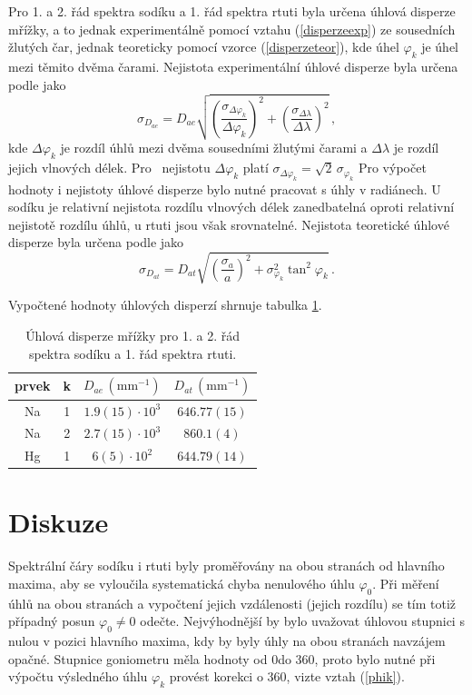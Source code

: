 \documentclass{../concepts/titul_protokol_p/prepareprotokol} %
\newcommand{\relative}[1]{
\frac{\sigma_{#1}}{#1}
}
\newcommand{\squared}[1]{
\left( #1 \right)^2
}
\newcommand{\relsqr}[1]{
\squared{\relative{#1}}
}
\begin{document}
Pro 1. a 2. řád spektra sodíku a 1. řád spektra rtuti byla určena úhlová
disperze mřížky, a to jednak experimentálně pomocí vztahu (\ref{disperzeexp})
ze sousedních žlutých čar, jednak teoreticky pomocí vzorce (\ref{disperzeteor}),
kde úhel $\varphi_k$ je úhel mezi těmito dvěma čarami. Nejistota
experimentální úhlové disperze byla určena podle \cite{englich} jako
\begin{equation}\label{sigmaDe}
    \sigma_{D_{ae}} = D_{ae} \sqrt{\relsqr{\Delta \varphi_k} + \relsqr{\Delta \lambda}} \, ,
\end{equation}
kde $\Delta \varphi_k$ je rozdíl úhlů mezi dvěma sousedními žlutými čarami
a $\Delta \lambda$ je rozdíl jejich vlnových délek. Pro~ nejistotu
$\Delta \varphi_k$ platí $\sigma_{\Delta \varphi_k} = \sqrt{2}\,\sigma_{\varphi_k}$
Pro výpočet hodnoty i nejistoty
úhlové disperze bylo nutné pracovat s úhly v radiánech. U sodíku je relativní nejistota
rozdílu vlnových délek zanedbatelná oproti relativní nejistotě rozdílu úhlů,
u rtuti jsou však srovnatelné.
Nejistota teoretické úhlové disperze byla určena podle \cite{englich} jako
\begin{equation}\label{sigmaDt}
    \sigma_{D_{at}} = D_{at} \sqrt{\relsqr{a} + {\sigma^2_{\varphi_k}\tan^2 \varphi_k}} \, .
\end{equation}

Vypočtené hodnoty úhlových disperzí shrnuje tabulka \ref{tab:disperze}.

\begin{table}[!htbp]
\centering
\caption{Úhlová disperze mřížky pro 1. a 2. řád spektra sodíku a 1. řád spektra rtuti.}
\begin{tabular}{cccc}
 \toprule
 prvek & k & $D_{ae}\, (\mathrm{mm^{-1}})$ & $D_{at}\, (\mathrm{mm^{-1}})$ \\
 \midrule
 Na & 1 & $1.9(15)\cdot 10^3$ & $646.77(15)$ \\
 Na & 2 & $2.7(15)\cdot 10^3$ & $860.1(4)$ \\
 Hg & 1 & $6(5)\cdot 10^2$ & $644.79(14)$ \\
 \bottomrule
\end{tabular}
\label{tab:disperze}
\end{table}

\section{Diskuze}

Spektrální čáry sodíku i rtuti byly proměřovány na obou stranách od hlavního
maxima, aby se vyloučila systematická chyba nenulového úhlu $\varphi_0$.
Při měření úhlů na obou stranách a vypočtení jejich vzdálenosti (jejich rozdílu)
se tím totiž případný posun $\varphi_0 \neq 0$ odečte. Nejvýhodnější by bylo
uvažovat úhlovou stupnici s nulou v pozici hlavního maxima, kdy by byly
úhly na obou stranách navzájem opačné. Stupnice goniometru měla hodnoty
od 0\degree do 360\degree, proto bylo nutné při výpočtu výsledného úhlu $\varphi_k$
provést korekci o 360\degree, vizte vztah (\ref{phik}).
\end{document}

